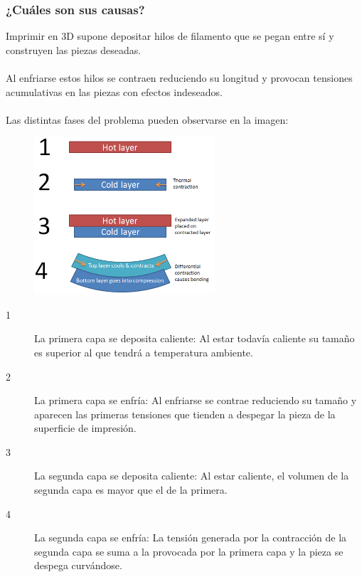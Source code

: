\documentclass[11pt,a4paper]{article}
\begin{document}
		\subsubsection{¿Cuáles son sus causas?}Imprimir en 3D supone depositar hilos de filamento que se pegan entre sí y construyen las piezas deseadas.
\\\\
Al enfriarse estos hilos se contraen reduciendo su longitud y provocan tensiones acumulativas en las piezas con efectos indeseados.
\\\\
Las distintas fases del problema pueden observarse en la imagen:
\begin{figure}[H]
\centering
\includegraphics[width=0.6\textwidth,cfbox=azul_marcos 4pt 0pt]{FOTOS/CAUSA_WARPING_1}
\end{figure}

\begin{description}
\item[1] La primera capa se deposita caliente: Al estar todavía caliente su tamaño es superior al que tendrá a temperatura ambiente.
\item[2] La primera capa se enfría: Al enfriarse se contrae reduciendo su tamaño y aparecen las primeras tensiones que tienden a despegar la pieza de la superficie de impresión.
\item[3] La segunda capa se deposita caliente: Al estar caliente, el volumen de la segunda capa es mayor que el de la primera.
\item[4] La segunda capa se enfría: La tensión generada por la contracción de la segunda capa se suma a la provocada por la primera capa y la pieza se despega curvándose.
\end{description}
\end{document}
